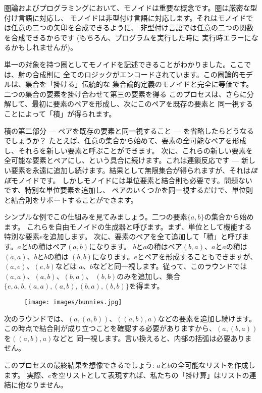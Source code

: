 
\lettrine[lhang=0.17]{圏}{論}およびプログラミングにおいて、モノイドは重要な概念です。圏は厳密な型付け言語に対応し、
モノイドは非型付け言語に対応します。それはモノイドでは任意の二つの矢印を合成できるように、
非型付け言語では任意の二つの関数を合成できるからです (もちろん、プログラムを実行した時に
実行時エラーになるかもしれませんが)。

単一の対象を持つ圏としてモノイドを記述できることがわかりました。ここでは、射の合成則に
全てのロジックがエンコードされています。この圏論的モデルは、集合を「掛ける」伝統的な
集合論的定義のモノイドと完全に等価です。二つの集合の要素を掛け合わせて第三の要素を得る
このプロセスは、さらに分解して、最初に要素のペアを形成し、次にこのペアを既存の要素と
同一視することによって「積」が得られます。

積の第二部分  ---  ペアを既存の要素と同一視すること  ---  を省略したらどうなるでしょうか？
たとえば、任意の集合から始めて、要素の全可能なペアを形成し、それらを新しい要素と呼ぶことができます。
次に、これらの新しい要素を全可能な要素とペアにし、という具合に続けます。これは連鎖反応です  --- 
新しい要素を永遠に追加し続けます。結果として無限集合が得られますが、それは\emph{ほぼ}モノイドです。
しかしモノイドには単位要素と結合則も必要です。問題ないです、特別な単位要素を追加し、
ペアのいくつかを同一視するだけで、単位則と結合則をサポートすることができます。

シンプルな例でこの仕組みを見てみましょう。二つの要素$\{a, b\}$の集合から始めます。
これらを自由モノイドの生成器と呼びます。まず、単位として機能する特別な要素$e$を追加します。
次に、要素のペアを全て追加して「積」と呼びます。$a$と$b$の積はペア$(a, b)$になります。
$b$と$a$の積はペア$(b, a)$、$a$と$a$の積は$(a, a)$、$b$と$b$の積は
$(b, b)$になります。$e$とペアを形成することもできますが、$(a, e)$、$(e, b)$などは
$a$、$b$などと同一視します。従って、このラウンドでは$(a, a)$、$(a, b)$、$(b, a)$、
$(b, b)$のみを追加し、集合$\{e, a, b, (a, a), (a, b), (b, a), (b, b)\}$を得ます。

\begin{figure}[H]
  \centering
  \texttt{[image: images/bunnies.jpg]}
\end{figure}

\noindent
次のラウンドでは、$(a, (a, b))$、$((a, b), a)$などの要素を追加し続けます。
この時点で結合則が成り立つことを確認する必要がありますから、$(a, (b, a))$を$((a, b), a)$などと
同一視します。言い換えると、内部の括弧は必要ありません。

このプロセスの最終結果を想像できるでしょう: $a$と$b$の全可能なリストを作成します。
実際、$e$を空リストとして表現すれば、私たちの「掛け算」はリストの連結に他なりません。

